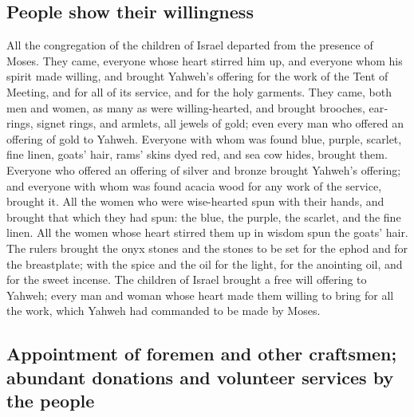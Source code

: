 \begin{paracol}{2}
\begin{otherlanguage}{english}
\hypertarget{people-show-their-willingness}{%
\subsection{People show their
willingness}\label{people-show-their-willingness}}

 All the congregation of the children of Israel departed
from the presence of Moses.  They came, everyone whose
heart stirred him up, and everyone whom his spirit made willing, and
brought Yahweh's offering for the work of the Tent of Meeting, and for
all of its service, and for the holy garments.  They
came, both men and women, as many as were willing-hearted, and brought
brooches, earrings, signet rings, and armlets, all jewels of gold; even
every man who offered an offering of gold to Yahweh. 
Everyone with whom was found blue, purple, scarlet, fine linen, goats'
hair, rams' skins dyed red, and sea cow hides, brought them.
 Everyone who offered an offering of silver and bronze
brought Yahweh's offering; and everyone with whom was found acacia wood
for any work of the service, brought it.  All the women
who were wise-hearted spun with their hands, and brought that which they
had spun: the blue, the purple, the scarlet, and the fine linen.
 All the women whose heart stirred them up in wisdom spun
the goats' hair.  The rulers brought the onyx stones and
the stones to be set for the ephod and for the breastplate;
 with the spice and the oil for the light, for the
anointing oil, and for the sweet incense.  The children
of Israel brought a free will offering to Yahweh; every man and woman
whose heart made them willing to bring for all the work, which Yahweh
had commanded to be made by Moses.

\hypertarget{appointment-of-foremen-and-other-craftsmen-abundant-donations-and-volunteer-services-by-the-people}{%
\subsection{Appointment of foremen and other craftsmen; abundant
donations and volunteer services by the
people}\label{appointment-of-foremen-and-other-craftsmen-abundant-donations-and-volunteer-services-by-the-people}}


\end{otherlanguage}
\end{paracol}
